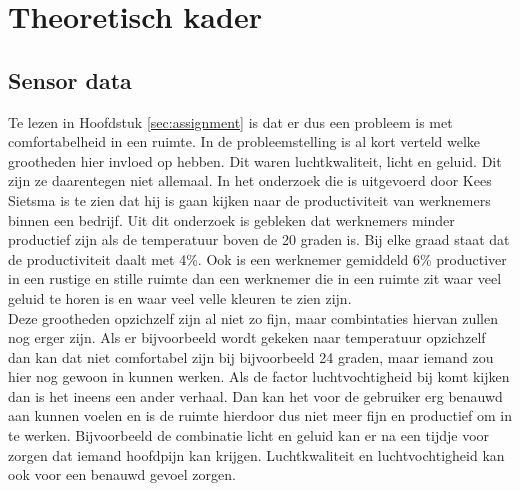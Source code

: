 
\section{Theoretisch kader} \label{sec:theory}

\subsection{Sensor data}
Te lezen in Hoofdstuk \ref{sec:assignment} is dat er dus een probleem is met comfortabelheid in een ruimte. In de probleemstelling is al 
kort verteld welke grootheden hier invloed op hebben. Dit waren luchtkwaliteit, licht en geluid. Dit zijn ze daarentegen niet allemaal. 
In het onderzoek die is uitgevoerd door Kees Sietsma \cite{productiviteit} is te zien dat hij is gaan kijken naar de 
productiviteit van werknemers binnen een bedrijf. Uit dit onderzoek is gebleken dat werknemers minder productief zijn als de temperatuur
boven de 20 graden is. Bij elke graad staat dat de productiviteit daalt met 4\%. Ook is een werknemer gemiddeld 6\% productiver in een rustige
en stille ruimte dan een werknemer die in een ruimte zit waar veel geluid te horen is en waar veel velle kleuren te zien zijn. \\

Deze grootheden opzichzelf zijn al niet zo fijn, maar combintaties hiervan zullen nog erger zijn. Als er bijvoorbeeld wordt gekeken naar
temperatuur opzichzelf dan kan dat niet comfortabel zijn bij bijvoorbeeld 24 graden, maar iemand zou hier nog gewoon in kunnen werken. 
Als de factor luchtvochtigheid bij komt kijken dan is het ineens een ander verhaal. Dan kan het voor de gebruiker erg benauwd aan kunnen
voelen en is de ruimte hierdoor dus niet meer fijn en productief om in te werken. Bijvoorbeeld de combinatie licht en geluid kan er na 
een tijdje voor zorgen dat iemand hoofdpijn kan krijgen. Luchtkwaliteit en luchtvochtigheid kan ook voor een benauwd gevoel zorgen. \\


